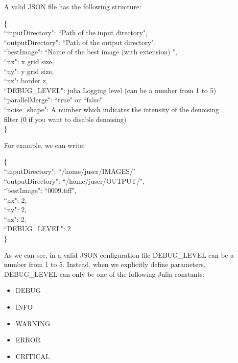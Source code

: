 \documentclass[11pt,oneside]{article}	%
\begin{document}
A valid JSON file has the following structure:
\begin{tabbing}
\{ \= \\
\>  ``inputDirectory": ``Path of the input directory",\\
\>  ``outputDirectory": ``Path of the output directory",\\
\>  ``bestImage": ``Name of the best image (with extension) ",\\
\>  ``nx": x grid size,\\
\>  ``ny": y grid size,\\
\>  ``nz": border z,\\
\>  ``DEBUG\_LEVEL": julia Logging level (can be a number from 1 to 5)\\
\>  ``parallelMerge": ``true" or ``false" \\
\>  ``noise\_shape": A number which indicates the intensity of the denoising \\
filter (0 if you want to disable denoising)\\
\}\\
\end{tabbing}

For example, we can write:

\begin{tabbing}
\{ \= \\
\>  ``inputDirectory": ``/home/juser/IMAGES/"\\
\>  ``outputDirectory": ``/home/juser/OUTPUT/",\\
\>  ``bestImage": ``0009.tiff",\\
\>  ``nx": 2,\\
\>  ``ny": 2,\\
\>  ``nz": 2,\\
\>  ``DEBUG\_LEVEL": 2\\
\}\\
\end{tabbing}

As we can see, in a valid JSON configuration file DEBUG\_LEVEL can be a number from 1 to 5. Instead, when we explicitly define parameters, DEBUG\_LEVEL can only be one of the following Julia constants:

\begin{itemize}
 \item DEBUG
 \item INFO
 \item WARNING
 \item ERROR
 \item CRITICAL
\end{itemize}
\end{document}
